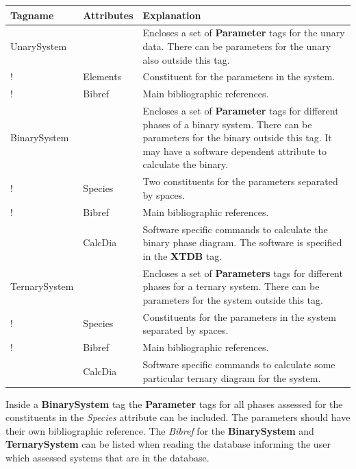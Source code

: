 \documentclass{article}
\begin{document}
\bigskip
\begin{tabular}{|p{} p{} p{}|}\hline
  Tagname& Attributes &  Explanation\\\hline

  UnarySystem  && Encloses a set of {\bf Parameter} tags for the unary data.
          There can be parameters for the unary also outside this tag.\\
!          & Elements & Constituent for the parameters in the system.\\
!          & Bibref & Main bibliographic references.\\\hline

  BinarySystem  && Encloses a set of {\bf Parameter} tags for different
          phases of a binary system.
          There can be parameters for the binary outside this tag.  It may
          have a software dependent attribute to calculate the binary.\\
!          & Species & Two constituents for the parameters 
                       separated by spaces.  \\
!          & Bibref & Main bibliographic references.\\
          & CalcDia & Software specific commands to calculate the binary
                       phase diagram.  The software is specified in the
                       {\bf XTDB} tag.\\\hline

  TernarySystem  && Encloses a set of {\bf Parameters} tags for different
           phases for a ternary system.
          There can be parameters for the system outside this tag.\\
!          & Species & Constituents for the parameters in the system 
                       separated by spaces.\\
!          & Bibref & Main bibliographic references.\\
          & CalcDia & Software specific commands to calculate some particular
                     ternary diagram for the system.\\\hline
\end{tabular}

\bigskip
Inside a {\bf BinarySystem} tag the {\bf Parameter} tags for all
phases assessed for the constituents in the {\em Species} attribute
can be included.  The parameters should have their own bibliographic
reference.  The {\em Bibref} for the {\bf BinarySystem} and {\bf
  TernarySystem} can be listed when reading the database informing the
user which assessed systems that are in the database.
\end{document}
